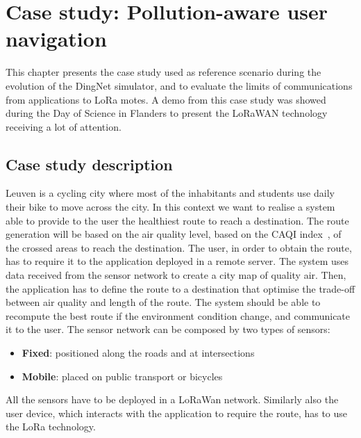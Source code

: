 \chapter{Case study: Pollution-aware user navigation}
\label{chap:case-staudyLoRa}

This chapter presents the case study used as reference scenario during the evolution of the DingNet simulator, and to evaluate the limits of communications from applications to LoRa motes. 
A demo from this case study was showed during the Day of Science in Flanders to present the LoRaWAN technology receiving a lot of attention.

\section{Case study description}
Leuven is a cycling city where most of the inhabitants and students use daily their bike to move across the city. 
In this context we want to realise a system able to provide to the user the healthiest route to reach a destination. 
The route generation will be based on the air quality level, based on the CAQI index~\cite{CAQI}, of the crossed areas to reach the destination. 
The user, in order to obtain the route, has to require it to the application deployed in a remote server.
The system uses data received from the sensor network to create a city map of quality air.
Then, the application has to define the route to a destination that optimise the trade-off between air quality and length of the route.
The system should be able to recompute the best route if the environment condition change, and communicate it to the user.
The sensor network can be composed by two types of sensors:
\begin{itemize}
    \item \textbf{Fixed}: positioned along the roads and at intersections
    \item \textbf{Mobile}: placed on public transport or bicycles
\end{itemize}
All the sensors have to be deployed in a LoRaWan network.
Similarly also the user device, which interacts with the application to require the route, has to use the LoRa technology.

